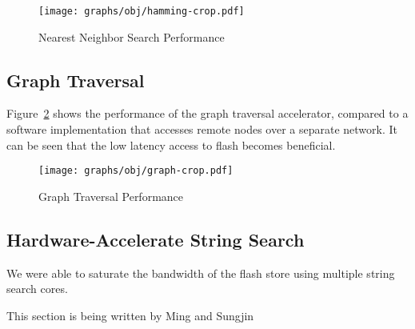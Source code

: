 \begin{figure}[h]
	\begin{center}
	\texttt{[image: graphs/obj/hamming-crop.pdf]}
	\caption{Nearest Neighbor Search Performance}
	\label{fig:result_hamming}
	\end{center}
\end{figure}

\subsection{Graph Traversal}

Figure~\ref{fig:result_graph} shows the performance of the graph traversal
accelerator, compared to a software implementation that accesses remote nodes
over a separate network. It can be seen that the low latency access to flash
becomes beneficial.

\begin{figure}[h]
	\begin{center}
	\texttt{[image: graphs/obj/graph-crop.pdf]}
	\caption{Graph Traversal Performance}
	\label{fig:result_graph}
	\end{center}
\end{figure}



\subsection{Hardware-Accelerate String Search}

We were able to saturate the bandwidth of the flash store using multiple string
search cores.

This section is being written by Ming and Sungjin

